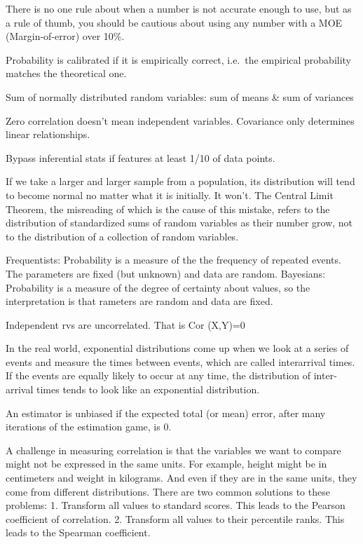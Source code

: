 \documentclass[]{book}
\begin{document}
There is no one rule about when a number is not accurate enough to use, but as a rule of thumb, you should be cautious about using any number with a MOE (Margin-of-error) over 10\%.

Probability is calibrated if it is empirically correct, i.e.~the empirical probability matches the theoretical one.

Sum of normally distributed random variables: sum of means \& sum of variances

Zero correlation doesn't mean independent variables. Covariance only determines linear relationships.

Bypass inferential stats if features at least 1/10 of data points.

If we take a larger and larger sample from a population, its distribution will tend to become normal no matter what it is initially. It won't. The Central Limit Theorem, the misreading of which is the cause of this mistake, refers to the distribution of standardized sums of random variables as their number grow, not to the distribution of a collection of random variables.

Frequentists: Probability is a measure of the the frequency of repeated events. The parameters are fixed (but unknown) and data are random. Bayesians: Probability is a measure of the degree of certainty about values, so the interpretation is that rameters are random and data are fixed.

Independent rvs are uncorrelated. That is Cor (X,Y)=0

In the real world, exponential distributions come up when we look at a series of events and measure the times between events, which are called interarrival times. If the events are equally likely to occur at any time, the distribution of inter-arrival times tends to look like an exponential distribution.

An estimator is unbiased if the expected total (or mean) error, after many iterations of the estimation game, is 0.

A challenge in measuring correlation is that the variables we want to compare might not be expressed in the same units. For example, height might be in centimeters and weight in kilograms. And even if they are in the same
units, they come from different distributions. There are two common solutions to these problems: 1. Transform all values to standard scores. This leads to the Pearson coefficient of correlation. 2. Transform all values to their percentile ranks. This leads to the Spearman coefficient.
\end{document}
